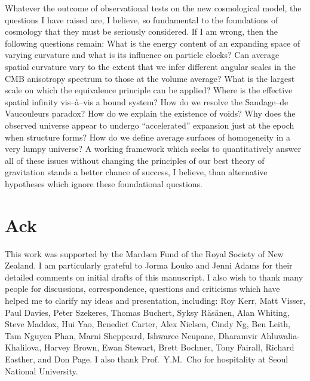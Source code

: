\documentclass[12pt]{article}
\begin{document}
Whatever the outcome of observational tests on the new cosmological model, the
questions I have raised are, I believe, so fundamental to the foundations
of cosmology that they must be seriously considered. If I am wrong, then the
following questions remain: What is the energy content of an expanding space
of varying curvature and what is its influence on particle clocks? Can
average spatial curvature vary to the extent that we infer different
angular scales in the CMB anisotropy spectrum to those at the volume average?
What is the largest scale on which the equivalence principle can be applied?
Where is the effective spatial infinity vis--\`a--vis a bound system?
How do we resolve the Sandage--de Vaucouleurs paradox? How do we explain the
existence of voids? Why does the observed universe appear to undergo
``accelerated'' expansion just at the epoch when structure forms? How do we
define average surfaces of homogeneity in a very lumpy universe? A working
framework which seeks to
quantitatively answer all of these issues without changing the principles of
our best theory of gravitation stands a better chance of success, I believe,
than alternative hypotheses which ignore these foundational questions.

\section{Ack}

This work was supported by the Mardsen Fund of the Royal Society of New
Zealand. I am particularly grateful to Jorma Louko and Jenni Adams for their
detailed comments on initial drafts of this manuscript. I also wish to thank
many people for discussions, correspondence, questions and criticisms
which have helped me to clarify my ideas and presentation, including:
Roy Kerr, Matt Visser, Paul Davies, Peter Szekeres, Thomas Buchert,
Syksy R\"as\"anen, Alan Whiting, Steve Maddox, Hui Yao, Benedict Carter,
Alex Nielsen, Cindy Ng, Ben Leith, Tam Nguyen Phan, Marni Sheppeard,
Ishwaree Neupane, Dharamvir Ahluwalia-Khalilova, Harvey Brown, Ewan Stewart,
Brett Bochner, Tony Fairall, Richard Easther, and Don Page.
I also thank Prof.\ Y.M.~Cho for hospitality at Seoul National University.
\end{document}
